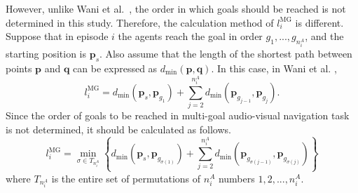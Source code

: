 However, unlike Wani et al.~\cite{wani2020multion}, the order in which goals should be reached is not determined in this study.
Therefore, the calculation method of $l^\mathrm{MG}_i$ is different.
Suppose that in episode $i$ the agents reach the goal in order $g_1, ... , g_{n^A_i}$, and the starting position is $\bm{p}_s$.
Also assume that the length of the shortest path between points $\bm{p}$ and $\bm{q}$ can be expressed as $d_{\mathrm{min}}(\bm{p}, \bm{q})$.
In this case, in Wani et al. \cite{wani2020multion}, 
\[
l^\mathrm{MG}_i = d_{\mathrm{min}}(\bm{p}_{s}, \bm{p}_{g_1}) + \sum_{j=2}^{n^A_i} d_{\mathrm{min}}(\bm{p}_{g_{j-1}}, \bm{p}_{g_j}).
\]
Since the order of goals to be reached in multi-goal audio-visual navigation task is not determined, it should be calculated as follows.
\[
l^\mathrm{MG}_i = \min_{\sigma \in T_{n^A_i}} \!\left\{\! d_{\mathrm{min}}(\bm{p}_{s}, \bm{p}_{g_{\sigma(1)}}) +  \sum_{j=2}^{n^A_i} d_{\mathrm{min}}(\bm{p}_{g_{\sigma(j-1)}}, \bm{p}_{g_{\sigma(j)}}) \!\right\}
\]
where $T_{n^A_i}$ is the entire set of permutations of $n^A_i$ numbers $1, 2, ... ,n^A_i$.